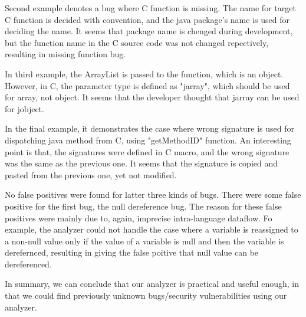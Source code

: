 Second example denotes a bug where C function is missing. The name for target C
function is decided with convention, and the java package's name is used
for deciding the name. It seems that package name is chenged during development,
but the function name in the C source code was not changed repectively, resulting
in missing function bug.

In third example, the ArrayList is passed to the function, which is an object.
However, in C, the parameter type is defined as "jarray", which should be used
for array, not object. It seems that the developer thought that jarray can be
used for jobject.

In the final example, it demonstrates the case where wrong signature is used
for dispatching java method from C, using "getMethodID" function. An interesting
point is that, the signatures were defined in C macro, and the wrong signature
was the same as the previous one. It seems that the signature is copied and pasted
from the previous one, yet not modified.

No false positives were found for latter three kinds of bugs.  There were some
false positive for the first bug, the null dereference bug. The reason for
these false positives were mainly due to, again, imprecise intra-language
dataflow. Fo example, the analyzer could not handle the case where a variable
is reassigned to a non-null value only if the value of a variable is null and
then the variable is derefernced, resulting in giving the false poitive that
null value can be dereferenced.

In summary, we can conclude that our analyzer is practical and useful enough,
in that we could find previously unknown bugs/security vulnerabilities using
our analyzer.
